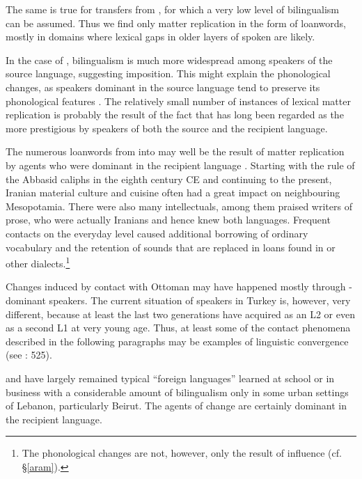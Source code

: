 \documentclass[output=paper]{langsci/langscibook}
\begin{document}
The same is true for transfers from , for which a very low level of {bilingualism} can be assumed. Thus we find only matter {replication} in the form of {loanwords}, mostly in domains where lexical gaps in older layers of spoken  are likely. 

In the case of , {bilingualism} is much more widespread among speakers of the {source language}, suggesting {imposition}. This might explain the phonological changes, as speakers dominant in the {source language} tend to preserve its phonological features \citep[532]{Lucas2015}. The relatively small number of instances of lexical matter {replication} is probably the result of the fact that  has long been regarded as the more {prestigious} by speakers of both the source and the {recipient language}.

The numerous {loanwords} from  into   may well be the result of matter {replication} by agents who were dominant in the {recipient language} . Starting with the rule of the Abbasid caliphs in the eighth century CE and continuing to the present, Iranian material culture and cuisine often had a great impact on neighbouring Mesopotamia. There were also many intellectuals, among them praised writers of  prose, who were actually Iranians and hence knew both languages. Frequent contacts on the everyday level caused additional borrowing of ordinary vocabulary and the retention of sounds that are replaced in  loans found in  or other dialects.\footnote{The phonological changes are not, however, only the result of  influence (cf. §\ref{aram}).} 

Changes induced by contact with Ottoman  may have happened mostly through -dominant speakers. The current situation of  speakers in Turkey is, however, very different, because at least the last two generations have acquired  as an L2 or even as a second L1 at very young age. Thus, at least some of the contact phenomena described in the following paragraphs may be examples of linguistic {convergence} (see \citealt{Lucas2015}: 525). 

 and  have largely remained typical “foreign languages” learned at school or in business with a considerable amount of {bilingualism} only in some urban settings of Lebanon, particularly Beirut. The agents of change are certainly dominant in the {recipient language}. 
\end{document}
